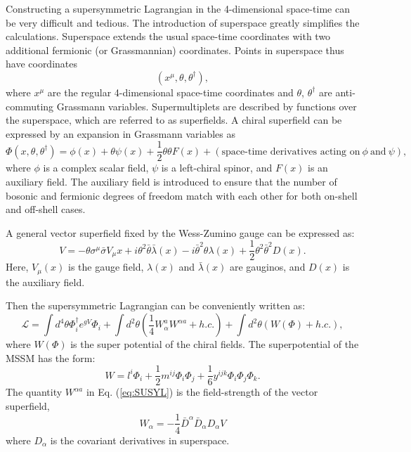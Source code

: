\documentclass[thesis.tex]{subfiles}
\begin{document}
Constructing a supersymmetric Lagrangian in the 4-dimensional space-time can be very difficult and tedious. 
The introduction of superspace greatly simplifies the calculations. 
Superspace extends the usual space-time coordinates with two additional fermionic (or Grassmannian) coordinates. 
Points in superspace thus have coordinates
     \begin{equation}
	(x^\mu, \theta, \theta^\dagger),
     \end{equation}
where $x^\mu$ are the regular 4-dimensional space-time coordinates and $\theta$, $\theta^\dagger$ are anti-commuting Grassmann variables.
Supermultiplets are described by functions over the superspace, which are referred to as superfields. 
A chiral superfield can be expressed by an expansion in Grassmann variables as
    \begin{equation}
    \Phi(x, \theta, \theta^\dagger) = \phi(x) + \theta\psi(x) + \frac{1}{2}\theta\theta F(x) + (\text{space-time derivatives acting on}\ \phi \ \text{and}\  \psi),
    \end{equation}
 where $\phi$ is a complex scalar field, $\psi$ is a left-chiral spinor, and $F(x)$ is an auxiliary field. 
 The auxiliary field is introduced to ensure that the number of bosonic and fermionic degrees of freedom match with each other for both on-shell and off-shell cases. 
 
 A general vector superfield fixed by the Wess-Zumino gauge \cite{Wess} can be expressed as: 
 	\begin{equation}
		V = -\theta \sigma^\mu \bar{\sigma}V_\mu{x} + i\theta^2 \bar{\theta}\bar{\lambda}(x) -  i\bar{\theta}^2 \theta\lambda(x) + \frac{1}{2}\theta^2 \bar{\theta}^2 D(x).
	\end{equation}
Here, $V_\mu(x)$ is the gauge field, $\lambda(x)$ and $\bar{\lambda}(x)$ are gauginos, and $D(x)$ is the auxiliary field. 

Then the supersymmetric Lagrangian can be conveniently written as: 
	\begin{equation}
		\mathcal{L} = \int d^4\theta \Phi_i^\dagger e^{gV}\Phi_i + \int d^2\theta (\frac{1}{4}W_\alpha^a W^{\alpha a} + h.c.) + \int d^2\theta (W(\Phi) + h.c.),
		 \label{eq:SUSYL}
	\end{equation}
where $W(\Phi)$ is the super potential of the chiral fields. The superpotential of the MSSM has the form: 
	\begin{equation}
		W = 	l^i\Phi_i + \frac{1}{2}m^{ij} \Phi_i \Phi_j + \frac{1}{6} y^{ijk} \Phi_i \Phi_j \Phi_k.
	\end{equation}
The quantity $W^{\alpha a}$ in Eq. (\ref{eq:SUSYL}) is the field-strength of the vector superfield,
	\begin{equation}
		W_\alpha = - \frac{1}{4}\bar{D}^\alpha \bar{D}_\alpha D_\alpha V
	\end{equation}
where $D_\alpha$ is the covariant derivatives in superspace. 
\end{document}
